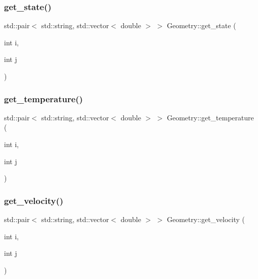 \mbox{\label{classGeometry_a4fb1baf2d513b47401e0df4b711c778e}} 
\subsubsection{\texorpdfstring{get\_state()}{get\_state()}}
{\footnotesize\ttfamily std\+::pair$<$ std\+::string, std\+::vector$<$ double $>$ $>$ Geometry\+::get\+\_\+state (\begin{DoxyParamCaption}\item[{int}]{i,  }\item[{int}]{j }\end{DoxyParamCaption})}

\mbox{\label{classGeometry_ad1dc1e33d48af4c66cc50dbeb3358f70}} 
\subsubsection{\texorpdfstring{get\_temperature()}{get\_temperature()}}
{\footnotesize\ttfamily std\+::pair$<$ std\+::string, std\+::vector$<$ double $>$ $>$ Geometry\+::get\+\_\+temperature (\begin{DoxyParamCaption}\item[{int}]{i,  }\item[{int}]{j }\end{DoxyParamCaption})}

\mbox{\label{classGeometry_a2787491f182a184331df6df1193416c5}} 
\subsubsection{\texorpdfstring{get\_velocity()}{get\_velocity()}}
{\footnotesize\ttfamily std\+::pair$<$ std\+::string, std\+::vector$<$ double $>$ $>$ Geometry\+::get\+\_\+velocity (\begin{DoxyParamCaption}\item[{int}]{i,  }\item[{int}]{j }\end{DoxyParamCaption})}




